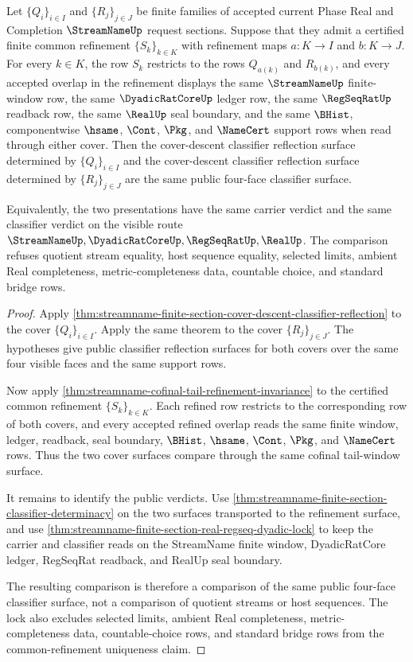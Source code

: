 \begin{theorem}
\label{thm:streamname-finite-cover-common-refinement-classifier-uniqueness}
Let $\{Q_i\}_{i \in I}$ and $\{R_j\}_{j \in J}$ be finite families of accepted
current Phase Real and Completion $\StreamNameUp$ request sections. Suppose
that they admit a certified finite common refinement $\{S_k\}_{k \in K}$ with
refinement maps $a : K \to I$ and $b : K \to J$. For every $k \in K$, the row
$S_k$ restricts to the rows $Q_{a(k)}$ and $R_{b(k)}$, and every accepted
overlap in the refinement displays the same $\StreamNameUp$ finite-window row,
the same $\DyadicRatCoreUp$ ledger row, the same $\RegSeqRatUp$ readback row,
the same $\RealUp$ seal boundary, and the same $\BHist$, componentwise
$\hsame$, $\Cont$, $\Pkg$, and $\NameCert$ support rows when read through
either cover. Then the cover-descent classifier reflection surface determined
by $\{Q_i\}_{i \in I}$ and the cover-descent classifier reflection surface
determined by $\{R_j\}_{j \in J}$ are the same public four-face classifier
surface.

Equivalently, the two presentations have the same carrier verdict and the same
classifier verdict on the visible route
$\StreamNameUp,\DyadicRatCoreUp,\RegSeqRatUp,\RealUp$. The comparison refuses
quotient stream equality, host sequence equality, selected limits, ambient Real
completeness, metric-completeness data, countable choice, and standard bridge
rows.
\end{theorem}
\begin{proof}
Apply
\autoref{thm:streamname-finite-section-cover-descent-classifier-reflection} to
the cover $\{Q_i\}_{i \in I}$. Apply the same theorem to the cover
$\{R_j\}_{j \in J}$. The hypotheses give public classifier reflection surfaces
for both covers over the same four visible faces and the same support rows.

Now apply \autoref{thm:streamname-cofinal-tail-refinement-invariance} to the
certified common refinement $\{S_k\}_{k \in K}$. Each refined row restricts to
the corresponding row of both covers, and every accepted refined overlap reads
the same finite window, ledger, readback, seal boundary, $\BHist$, $\hsame$,
$\Cont$, $\Pkg$, and $\NameCert$ rows. Thus the two cover surfaces compare
through the same cofinal tail-window surface.

It remains to identify the public verdicts. Use
\autoref{thm:streamname-finite-section-classifier-determinacy} on the two
surfaces transported to the refinement surface, and use
\autoref{thm:streamname-finite-section-real-regseq-dyadic-lock} to keep the
carrier and classifier reads on the StreamName finite window, DyadicRatCore
ledger, RegSeqRat readback, and RealUp seal boundary.

The resulting comparison is therefore a comparison of the same public
four-face classifier surface, not a comparison of quotient streams or host
sequences. The lock also excludes selected limits, ambient Real completeness,
metric-completeness data, countable-choice rows, and standard bridge rows from
the common-refinement uniqueness claim.
\end{proof}

